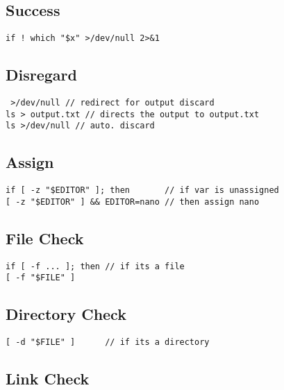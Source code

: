 \subsection{Success}

\begin{verbatim}
if ! which "$x" >/dev/null 2>&1
\end{verbatim}

\subsection{Disregard}

\begin{verbatim}
 >/dev/null // redirect for output discard
ls > output.txt // directs the output to output.txt
ls >/dev/null // auto. discard
\end{verbatim}

\subsection{Assign}

\begin{verbatim}
if [ -z "$EDITOR" ]; then       // if var is unassigned
[ -z "$EDITOR" ] && EDITOR=nano // then assign nano
\end{verbatim}

\subsection{File Check}

\begin{verbatim}
if [ -f ... ]; then // if its a file
[ -f "$FILE" ] 
\end{verbatim}

\subsection{Directory Check}

\begin{verbatim}
[ -d "$FILE" ]      // if its a directory
\end{verbatim}

\subsection{Link Check}

